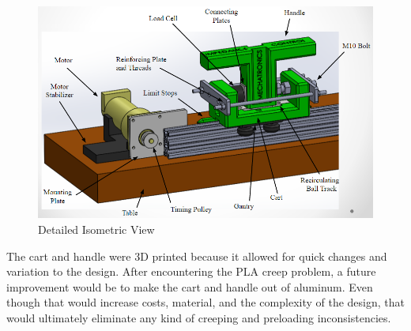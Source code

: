 \begin{figure}[H]	
\centering
\includegraphics[width=1\linewidth]{Images/Annotated_Iso}
\caption{Detailed Isometric View}
\label{fig:Annotated_Iso}
\end{figure}

The cart and handle were 3D printed because it allowed for quick changes and variation to the design. After encountering the PLA creep problem, a future improvement would be to make the cart and handle out of aluminum. Even though that would increase costs, material, and the complexity of the design, that would ultimately eliminate any kind of creeping and preloading inconsistencies. 